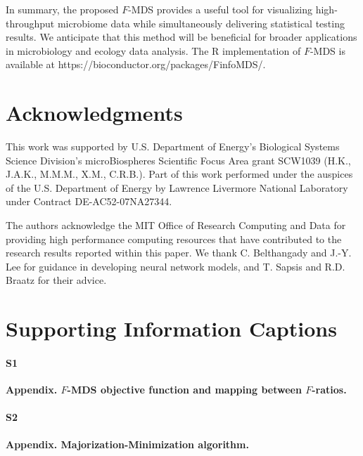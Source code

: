 \documentclass[10pt,letterpaper]{article}
\newcommand{\1}{{\rm 1}\kern-0.24em{\rm I}}
\begin{document}
In summary, the proposed $F$-MDS provides a useful tool for visualizing high-throughput microbiome data while simultaneously delivering statistical testing results. We anticipate that this method will be beneficial for broader applications in microbiology and ecology data analysis. The R implementation of $F$-MDS is available at https://bioconductor.org/packages/FinfoMDS/.



\section*{Acknowledgments}
This work was supported by U.S. Department of Energy’s Biological Systems Science Division’s microBiospheres Scientific Focus Area grant SCW1039 (H.K., J.A.K., M.M.M., X.M., C.R.B.). Part of this work performed under the auspices of the U.S. Department of Energy by Lawrence Livermore National Laboratory under Contract DE-AC52-07NA27344.

The authors acknowledge the MIT Office of Research Computing and Data for providing high performance computing resources that have contributed to the research results reported within this paper. We thank C. Belthangady and J.-Y. Lee for guidance in developing neural network models, and T. Sapsis and R.D. Braatz for their advice.


\nolinenumbers




\section*{Supporting Information Captions}

\paragraph*{S1}\hspace{-2ex}
\label{sec:app1}
{\bf Appendix. $F$-MDS objective function and mapping between $F$-ratios.}

\paragraph*{S2}\hspace{-2ex}
\label{sec:app2}
{\bf Appendix. Majorization-Minimization algorithm.}
\end{document}
